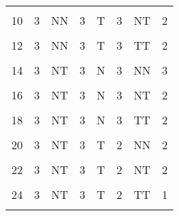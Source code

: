 \begin{table}[H]
{\begin{tabular}[t]{cccccccc}
			\cellcolor{gray!6}{9} & \cellcolor{gray!6}{3} & \cellcolor{gray!6}{NN} & \cellcolor{gray!6}{3} & \cellcolor{gray!6}{T} & \cellcolor{gray!6}{3} & \cellcolor{gray!6}{NT} & \cellcolor{gray!6}{2}\\
			10 & 3 & NN & 3 & T & 3 & NT & 2\\
			\cellcolor{gray!6}{11} & \cellcolor{gray!6}{3} & \cellcolor{gray!6}{NN} & \cellcolor{gray!6}{3} & \cellcolor{gray!6}{T} & \cellcolor{gray!6}{3} & \cellcolor{gray!6}{TT} & \cellcolor{gray!6}{2}\\
			12 & 3 & NN & 3 & T & 3 & TT & 2\\
			\cellcolor{gray!6}{13} & \cellcolor{gray!6}{3} & \cellcolor{gray!6}{NT} & \cellcolor{gray!6}{3} & \cellcolor{gray!6}{N} & \cellcolor{gray!6}{3} & \cellcolor{gray!6}{NN} & \cellcolor{gray!6}{3}\\
			14 & 3 & NT & 3 & N & 3 & NN & 3\\
			\cellcolor{gray!6}{15} & \cellcolor{gray!6}{3} & \cellcolor{gray!6}{NT} & \cellcolor{gray!6}{3} & \cellcolor{gray!6}{N} & \cellcolor{gray!6}{3} & \cellcolor{gray!6}{NT} & \cellcolor{gray!6}{2}\\
			16 & 3 & NT & 3 & N & 3 & NT & 2\\
			\cellcolor{gray!6}{17} & \cellcolor{gray!6}{3} & \cellcolor{gray!6}{NT} & \cellcolor{gray!6}{3} & \cellcolor{gray!6}{N} & \cellcolor{gray!6}{3} & \cellcolor{gray!6}{TT} & \cellcolor{gray!6}{2}\\
			18 & 3 & NT & 3 & N & 3 & TT & 2\\
			\cellcolor{gray!6}{19} & \cellcolor{gray!6}{3} & \cellcolor{gray!6}{NT} & \cellcolor{gray!6}{3} & \cellcolor{gray!6}{T} & \cellcolor{gray!6}{2} & \cellcolor{gray!6}{NN} & \cellcolor{gray!6}{2}\\
			20 & 3 & NT & 3 & T & 2 & NN & 2\\
			\cellcolor{gray!6}{21} & \cellcolor{gray!6}{3} & \cellcolor{gray!6}{NT} & \cellcolor{gray!6}{3} & \cellcolor{gray!6}{T} & \cellcolor{gray!6}{2} & \cellcolor{gray!6}{NT} & \cellcolor{gray!6}{2}\\
			22 & 3 & NT & 3 & T & 2 & NT & 2\\
			\cellcolor{gray!6}{23} & \cellcolor{gray!6}{3} & \cellcolor{gray!6}{NT} & \cellcolor{gray!6}{3} & \cellcolor{gray!6}{T} & \cellcolor{gray!6}{2} & \cellcolor{gray!6}{TT} & \cellcolor{gray!6}{1}\\
			24 & 3 & NT & 3 & T & 2 & TT & 1\\
			\cellcolor{gray!6}{25} & \cellcolor{gray!6}{3} & \cellcolor{gray!6}{TT} & \cellcolor{gray!6}{2} & \cellcolor{gray!6}{N} & \cellcolor{gray!6}{2} & \cellcolor{gray!6}{NN} & \cellcolor{gray!6}{2}\\

\end{tabular}}
\end{table}
